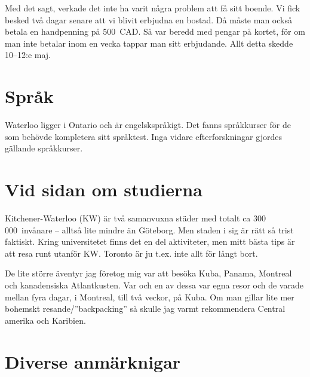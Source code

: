\documentclass[11pt,a4paper, english, swedish]{article}
\begin{document}
Med det sagt, verkade det inte ha varit några problem att få sitt
boende. Vi fick besked två dagar senare att vi blivit erbjudna en
bostad. Då måste man också betala en 
handpenning på 500~CAD. Så var beredd
med pengar på kortet, för om man inte betalar inom en vecka tappar man
sitt erbjudande.
Allt detta skedde 10--12:e maj.





\section{Språk}
Waterloo ligger i Ontario och är engelskspråkigt. Det fanns
språkkurser för de som behövde kompletera sitt språktest. Inga vidare
efterforskningar gjordes gällande språkkurser. 



\section{Vid sidan om studierna}
Kitchener-Waterloo (KW) är två samanvuxna städer med totalt ca
300\,000~invånare -- alltså lite mindre än Göteborg. Men staden i sig
är rätt så trist faktiskt. Kring universitetet finns det en del
aktiviteter, men mitt bästa tips är att resa runt utanför KW. Toronto
är ju t.ex. inte allt för långt bort.


De lite större äventyr jag företog mig var att besöka Kuba, Panama,
Montreal och kanadensiska Atlantkusten. Var och en av dessa var egna
resor och de varade mellan fyra dagar, i Montreal, till två veckor, på
Kuba. Om man gillar lite mer bohemskt resande/''backpacking'' så
skulle jag varmt rekommendera Central amerika och Karibien. 







\section{Diverse anmärknigar}
\end{document}
